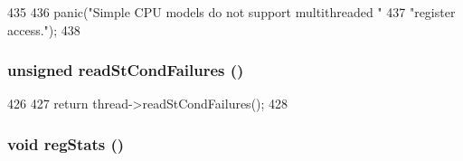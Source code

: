 \begin{DoxyCode}
435      {
436         panic("Simple CPU models do not support multithreaded "
437               "register access.\n");
438      }
\end{DoxyCode}
\hypertarget{classBaseSimpleCPU_a25b995a791e41965e088d8bf3f2bf859}{
\subsubsection[{readStCondFailures}]{\setlength{\rightskip}{0pt plus 5cm}unsigned readStCondFailures ()}}
\label{classBaseSimpleCPU_a25b995a791e41965e088d8bf3f2bf859}



\begin{DoxyCode}
426                                   {
427         return thread->readStCondFailures();
428     }
\end{DoxyCode}
\hypertarget{classBaseSimpleCPU_a4dc637449366fcdfc4e764cdf12d9b11}{
\subsubsection[{regStats}]{\setlength{\rightskip}{0pt plus 5cm}void regStats ()}}
\label{classBaseSimpleCPU_a4dc637449366fcdfc4e764cdf12d9b11}



